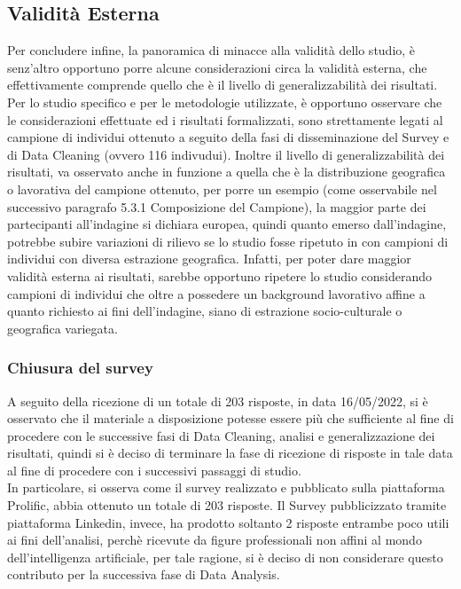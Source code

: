 \subsection{Validità Esterna}
Per concludere infine, la panoramica di minacce alla validità dello studio, è senz'altro opportuno porre alcune considerazioni circa la validità esterna, che effettivamente comprende quello che è il livello di generalizzabilità dei risultati. Per lo studio specifico e per le metodologie utilizzate, è opportuno osservare che le considerazioni effettuate ed i risultati formalizzati, sono strettamente legati al campione di individui ottenuto a seguito della fasi di disseminazione del Survey e di Data Cleaning (ovvero 116 indivudui). Inoltre il livello di generalizzabilità dei risultati, va osservato anche in funzione a quella che è la distribuzione geografica o lavorativa del campione ottenuto, per porre un esempio (come osservabile nel successivo paragrafo 5.3.1 Composizione del Campione), la maggior parte dei partecipanti all'indagine si dichiara europea, quindi quanto emerso dall'indagine, potrebbe subire variazioni di rilievo se lo studio fosse ripetuto in con campioni di individui con diversa estrazione geografica. Infatti, per poter dare maggior validità esterna ai risultati, sarebbe opportuno ripetere lo studio considerando campioni di individui che oltre a possedere un background lavorativo affine a quanto richiesto ai fini dell'indagine, siano di estrazione socio-culturale o geografica variegata.


 \subsubsection{Chiusura del survey}
    A seguito della ricezione di un totale di 203 risposte, in data 16/05/2022, si è osservato che il materiale a disposizione potesse essere più che sufficiente al fine di procedere con le successive fasi di Data Cleaning, analisi e generalizzazione dei risultati, quindi si è deciso di terminare la fase di ricezione di risposte in tale data al fine di procedere con i successivi passaggi di studio.\\
    In particolare, si osserva come il survey realizzato e pubblicato sulla piattaforma Prolific, abbia ottenuto un totale di 203 risposte. Il Survey pubblicizzato tramite piattaforma Linkedin, invece, ha prodotto soltanto 2 risposte entrambe poco utili ai fini dell'analisi, perchè ricevute da figure professionali non affini al mondo dell'intelligenza artificiale, per tale ragione, si è deciso di non considerare questo contributo per la successiva fase di Data Analysis.
\newpage

